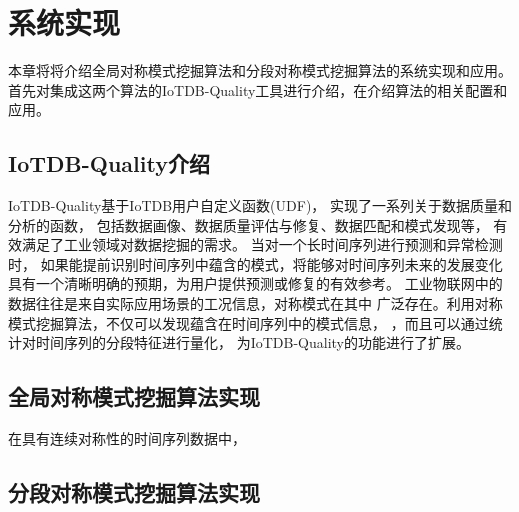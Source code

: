 
\chapter{系统实现}
本章将将介绍全局对称模式挖掘算法和分段对称模式挖掘算法的系统实现和应用。
首先对集成这两个算法的IoTDB-Quality工具进行介绍，在介绍算法的相关配置和
应用。

\section{IoTDB-Quality介绍}
IoTDB-Quality基于IoTDB用户自定义函数(UDF)，
实现了一系列关于数据质量和分析的函数，
包括数据画像、数据质量评估与修复、数据匹配和模式发现等，
有效满足了工业领域对数据挖掘的需求。
当对一个长时间序列进行预测和异常检测时，
如果能提前识别时间序列中蕴含的模式，将能够对时间序列未来的发展变化
具有一个清晰明确的预期，为用户提供预测或修复的有效参考。
工业物联网中的数据往往是来自实际应用场景的工况信息，对称模式在其中
广泛存在。利用对称模式挖掘算法，不仅可以发现蕴含在时间序列中的模式信息，
，而且可以通过统计对时间序列的分段特征进行量化，
为IoTDB-Quality的功能进行了扩展。

\section{全局对称模式挖掘算法实现}
在具有连续对称性的时间序列数据中，


\section{分段对称模式挖掘算法实现}